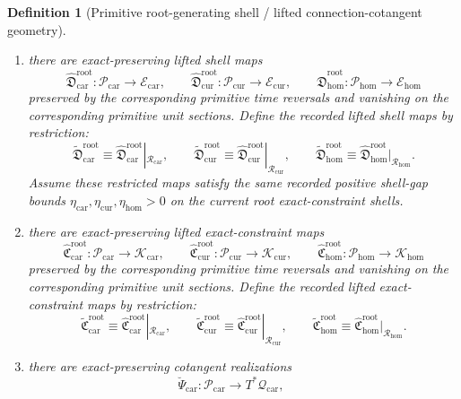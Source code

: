 \documentclass[11pt]{article}
\newcommand{\TensorShellTarget}{\mathcal E_{\mathrm{car}}}
\newcommand{\CurShellTarget}{\mathcal E_{\mathrm{cur}}}
\newcommand{\HomShellTarget}{\mathcal E_{\mathrm{hom}}}
\newcommand{\TensorShellGap}{\eta_{\mathrm{car}}}
\newcommand{\CurShellGap}{\eta_{\mathrm{cur}}}
\newcommand{\HomShellGap}{\eta_{\mathrm{hom}}}
\newcommand{\TensorConstraintTarget}{\mathcal K_{\mathrm{car}}}
\newcommand{\CurConstraintTarget}{\mathcal K_{\mathrm{cur}}}
\newcommand{\HomConstraintTarget}{\mathcal K_{\mathrm{hom}}}
\newcommand{\TensorConfigSpace}{\mathcal Q_{\mathrm{car}}}
\newcommand{\TensorOriginGap}{\epsilon_{\mathrm{car}}^{\mathrm{orig}}}
\newcommand{\CurOriginGap}{\epsilon_{\mathrm{cur}}^{\mathrm{orig}}}
\newcommand{\HomOriginGap}{\epsilon_{\mathrm{hom}}^{\mathrm{orig}}}
\newcommand{\TensorRootSpace}{\mathcal R_{\mathrm{car}}}
\newcommand{\CurRootSpace}{\mathcal R_{\mathrm{cur}}}
\newcommand{\HomRootSpace}{\mathcal R_{\mathrm{hom}}}
\newcommand{\TensorRootLiftedShellSection}{\widetilde{\mathfrak D}_{\mathrm{car}}^{\mathrm{root}}}
\newcommand{\CurRootLiftedShellSection}{\widetilde{\mathfrak D}_{\mathrm{cur}}^{\mathrm{root}}}
\newcommand{\HomRootLiftedShellSection}{\widetilde{\mathfrak D}_{\mathrm{hom}}^{\mathrm{root}}}
\newcommand{\TensorRootConstraintMap}{\widetilde{\mathfrak C}_{\mathrm{car}}^{\mathrm{root}}}
\newcommand{\CurRootConstraintMap}{\widetilde{\mathfrak C}_{\mathrm{cur}}^{\mathrm{root}}}
\newcommand{\HomRootConstraintMap}{\widetilde{\mathfrak C}_{\mathrm{hom}}^{\mathrm{root}}}
\newcommand{\TensorPrimitiveSpace}{\mathcal P_{\mathrm{car}}}
\newcommand{\CurPrimitiveSpace}{\mathcal P_{\mathrm{cur}}}
\newcommand{\HomPrimitiveSpace}{\mathcal P_{\mathrm{hom}}}
\newcommand{\TensorPrimitiveLiftedShellSection}{\widehat{\mathfrak D}_{\mathrm{car}}^{\mathrm{root}}}
\newcommand{\CurPrimitiveLiftedShellSection}{\widehat{\mathfrak D}_{\mathrm{cur}}^{\mathrm{root}}}
\newcommand{\HomPrimitiveLiftedShellSection}{\widehat{\mathfrak D}_{\mathrm{hom}}^{\mathrm{root}}}
\newcommand{\TensorPrimitiveConstraintMap}{\widehat{\mathfrak C}_{\mathrm{car}}^{\mathrm{root}}}
\newcommand{\CurPrimitiveConstraintMap}{\widehat{\mathfrak C}_{\mathrm{cur}}^{\mathrm{root}}}
\newcommand{\HomPrimitiveConstraintMap}{\widehat{\mathfrak C}_{\mathrm{hom}}^{\mathrm{root}}}
\newcommand{\TensorPrimitiveCotangentRealization}{\breve\Psi_{\mathrm{car}}}
\newtheorem{definition}{Definition}
\begin{document}
\begin{definition}[Primitive root-generating shell / lifted connection-cotangent geometry]
\begin{enumerate}
\begin{equation}
    \label{eq:lifted_ambient_from_primitive}
    \end{equation}
    Assume these restricted maps satisfy the same recorded positive ambient-generating gap bounds \(\TensorOriginGap,\CurOriginGap,\HomOriginGap>0\) on the current ambient shells cut out inside the current pre-ambient shells.
    \item there are exact-preserving lifted shell maps
    \[
    \TensorPrimitiveLiftedShellSection:\TensorPrimitiveSpace\to\TensorShellTarget,\qquad
    \CurPrimitiveLiftedShellSection:\CurPrimitiveSpace\to\CurShellTarget,\qquad
    \HomPrimitiveLiftedShellSection:\HomPrimitiveSpace\to\HomShellTarget
    \]
    preserved by the corresponding primitive time reversals and vanishing on the corresponding primitive unit sections. Define the recorded lifted shell maps by restriction:
    \begin{equation}
    \TensorRootLiftedShellSection\equiv\TensorPrimitiveLiftedShellSection|_{\TensorRootSpace},\qquad
    \CurRootLiftedShellSection\equiv\CurPrimitiveLiftedShellSection|_{\CurRootSpace},\qquad
    \HomRootLiftedShellSection\equiv\HomPrimitiveLiftedShellSection|_{\HomRootSpace}.
    \label{eq:root_lifted_shell_from_primitive}
    \end{equation}
    Assume these restricted maps satisfy the same recorded positive shell-gap bounds \(\TensorShellGap,\CurShellGap,\HomShellGap>0\) on the current root exact-constraint shells.
    \item there are exact-preserving lifted exact-constraint maps
    \[
    \TensorPrimitiveConstraintMap:\TensorPrimitiveSpace\to\TensorConstraintTarget,\qquad
    \CurPrimitiveConstraintMap:\CurPrimitiveSpace\to\CurConstraintTarget,\qquad
    \HomPrimitiveConstraintMap:\HomPrimitiveSpace\to\HomConstraintTarget
    \]
    preserved by the corresponding primitive time reversals and vanishing on the corresponding primitive unit sections. Define the recorded lifted exact-constraint maps by restriction:
    \begin{equation}
    \TensorRootConstraintMap\equiv\TensorPrimitiveConstraintMap|_{\TensorRootSpace},\qquad
    \CurRootConstraintMap\equiv\CurPrimitiveConstraintMap|_{\CurRootSpace},\qquad
    \HomRootConstraintMap\equiv\HomPrimitiveConstraintMap|_{\HomRootSpace}.
    \label{eq:root_constraint_from_primitive}
    \end{equation}
    \item there are exact-preserving cotangent realizations
    \[
    \TensorPrimitiveCotangentRealization:\TensorPrimitiveSpace\to T^*\TensorConfigSpace,\qquad
\]
\end{enumerate}
\end{definition}
\end{document}
